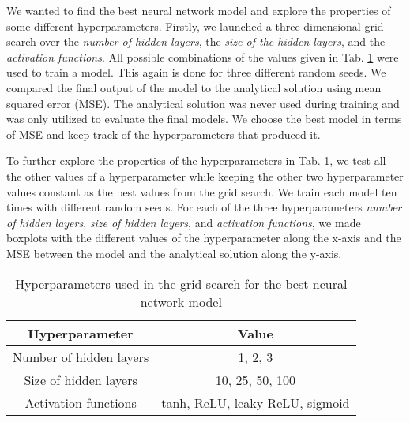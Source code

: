 
We wanted to find the best neural network model and explore the properties of some different hyperparameters. 
Firstly, we launched a three-dimensional grid search over the \textit{number of hidden layers}, the \textit{size of the hidden layers}, and the \textit{activation functions}. 
All possible combinations of the values given in Tab. \ref{tab:hyperparams} were used to train a model. 
This again is done for three different random seeds. 
We compared the final output of the model to the analytical solution using mean squared error (MSE). 
The analytical solution was never used during training and was only utilized to evaluate the final models. 
We choose the best model in terms of MSE and keep track of the hyperparameters that produced it. 

To further explore the properties of the hyperparameters in Tab. \ref{tab:hyperparams}, we test all the other values of a hyperparameter while keeping the other two hyperparameter values constant as the best values from the grid search. 
We train each model ten times with different random seeds.
For each of the three hyperparameters \textit{number of hidden layers}, \textit{size of hidden layers}, and \textit{activation functions}, we made boxplots with the different values of the hyperparameter along the x-axis and the MSE between the model and the analytical solution along the y-axis. 


\begin{table}[h!]
    \centering
    \begin{tabular}{|c|c|}
    \hline
        \textbf{Hyperparameter} & \textbf{Value}  \\ \hline
        Number of hidden layers & 1, 2, 3  \\ \hline
        Size of hidden layers & 10, 25, 50, 100 \\\hline
        Activation functions & tanh, ReLU, leaky ReLU, sigmoid \\ \hline
    \end{tabular}
    \caption{Hyperparameters used in the grid search for the best neural network model }
    \label{tab:hyperparams}
\end{table}
